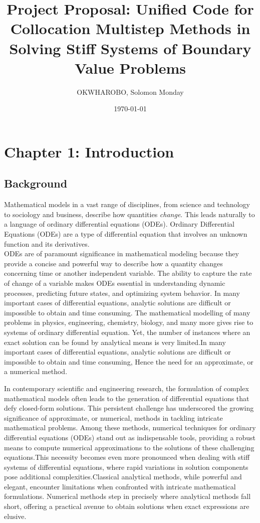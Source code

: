 \documentclass{report}
\title{Project Proposal: Unified Code for Collocation Multistep Methods in Solving Stiff Systems of Boundary Value Problems}
\author{OKWHAROBO, Solomon Monday}
\date{\today}
\begin{document}
\maketitle

\section{Chapter 1: Introduction}

\subsection{Background}
Mathematical models in a vast range of disciplines, from science and technology to sociology and business, describe how quantities \textsl{change}. This leads naturally to a language of ordinary differential equations (ODEs).
Ordinary Differential Equations (ODEs) are a type of differential equation that involves an unknown function and its derivatives. \\
ODEs are of paramount significance in mathematical modeling because they provide a concise and powerful way to describe how a quantity changes concerning time or another independent variable. The ability to capture the rate of change of a variable makes ODEs essential in understanding dynamic processes, predicting future states, and optimizing system behavior.
In many important cases of differential equations, analytic solutions are difficult or impossible to obtain and time
consuming.
The mathematical modelling of many problems in physics, engineering, chemistry, biology, and many more gives rise to systems of ordinary differential equation. Yet, the number of instances where an exact solution can be found by analytical means is very limited\cite{lambert1977}.In many important cases of differential equations, analytic solutions are difficult or impossible to obtain and time
consuming, Hence the need for an approximate, or a numerical method.

In contemporary scientific and engineering research, the formulation of complex mathematical models often leads to the generation of differential equations that defy closed-form solutions. This persistent challenge has underscored the growing significance of approximate, or numerical, methods in tackling intricate mathematical problems. Among these methods, numerical techniques for ordinary differential equations (ODEs) stand out as indispensable tools, providing a robust means to compute numerical approximations to the solutions of these challenging equations.This necessity becomes even more pronounced when dealing with stiff systems of differential equations, where rapid variations in solution components pose additional complexities.Classical analytical methods, while powerful and elegant, encounter limitations when confronted with intricate mathematical formulations. Numerical methods step in precisely where analytical methods fall short, offering a practical avenue to obtain solutions when exact expressions are elusive.
\end{document}
